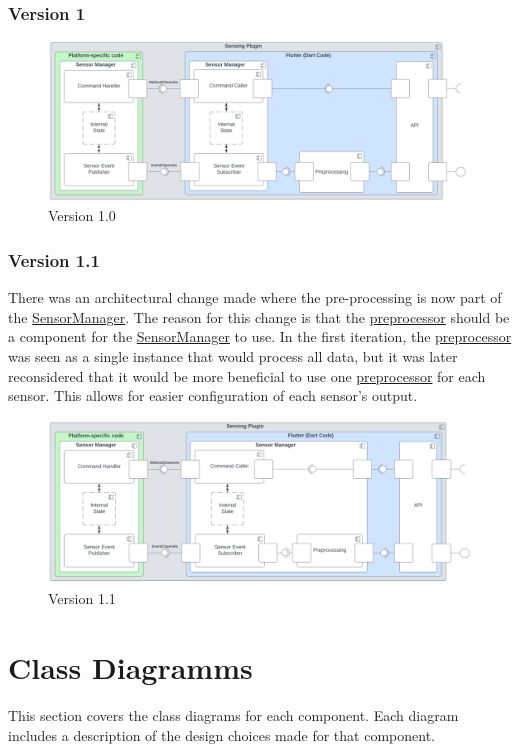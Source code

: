 \documentclass[12pt]{article}
\begin{document}
\subsubsection{Version 1}
\begin{figure}[ht]
\includegraphics[width=1\textwidth]{Graphics/SmartSensingPluginOld.png}
\caption{\label{fig:bild3} Version 1.0}
\end{figure}

\subsubsection{Version 1.1}
There was an architectural change made where the pre-processing is now part of the \hyperref[sec:SensorManager]{SensorManager}. The reason for this change is that the \hyperref[sec:Preprocessor]{preprocessor} should be a component for the \hyperref[sec:SensorManager]{SensorManager} to use. In the first iteration, the \hyperref[sec:Preprocessor]{preprocessor} was seen as a single instance that would process all data, but it was later reconsidered that it would be more beneficial to use one \hyperref[sec:Preprocessor]{preprocessor} for each sensor. This allows for easier configuration of each sensor's output.
\begin{figure}[ht]
\includegraphics[width=1\textwidth]{Graphics/SmartSensingPluginNew.png}
\caption{\label{fig:bild4} Version 1.1}
\end{figure}

\newpage
\section{Class Diagramms}
\label{sec:ClassDiagramms}
This section covers the class diagrams for each component. Each diagram includes a description of the design choices made for that component.
\end{document}
